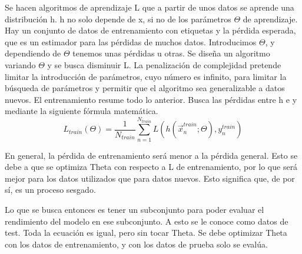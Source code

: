 Se hacen algoritmos de aprendizaje L que a partir de unos datos se aprende una distribución h. h no solo depende de x, si no de los parámetros $\Theta$ de aprendizaje. Hay un conjunto de datos de entrenamiento con etiquetas y la pérdida esperada, que es un estimador para las pérdidas de muchos datos. Introducimos $\Theta$, y dependiendo de $\Theta$ tenemos unas pérdidas u otras. Se diseña un algoritmo variando $\Theta$ y se busca disminuir L. La penalización de complejidad pretende limitar la introducción de parámetros, cuyo número es infinito, para limitar la búsqueda de parámetros y permitir que el algoritmo sea generalizable a datos nuevos. 
El entrenamiento resume todo lo anterior. Busca las pérdidas entre h e y mediante la siguiente fórmula matemática. 
$$L_{train}(\Theta) = \frac{1}{N_{train}} \sum^{N_{train}}_{n=1} L(h(\vec{x}^{train}_n; \Theta), y^{train}_n)$$

En general, la pérdida de entrenamiento será menor a la pérdida general. Esto se debe a que se optimiza Theta con respecto a L de entrenamiento, por lo que será mejor para los datos utilizados que para datos nuevos. Esto significa que, de por sí, es un proceso sesgado. 

Lo que se busca entonces es tener un subconjunto para poder evaluar el rendimiento del modelo en ese subconjunto. A esto se le conoce como datos de test. Toda la ecuación es igual, pero sin tocar Theta. Se debe optimizar Theta con los datos de entrenamiento, y con los datos de prueba solo se evalúa. 


